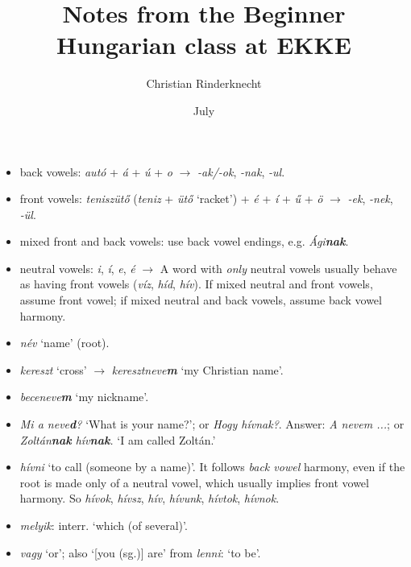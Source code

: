 \documentclass[a4paper,11pt]{article}
\title{Notes from the Beginner Hungarian class at EKKE}
\date{July \oldstylenums{2026}}
\author{Christian Rinderknecht}
\begin{document}
\maketitle

\begin{itemize}

  \item back vowels: \emph{autó} + \emph{á} + \emph{ú} + \emph{o}
    $\rightarrow$ \emph{-ak/-ok}, \emph{-nak}, \emph{-ul}.

  \item front vowels: \emph{teniszütő} (\emph{teniz} + \emph{ütő}
    `racket') + \emph{é} + \emph{í} + \emph{ű} + \emph{ö}
    $\rightarrow$ \emph{-ek}, \emph{-nek}, \emph{-ül}.

  \item mixed front and back vowels: use back vowel endings,
    e.g. \emph{Ági\textbf{nak}}.

  \item neutral vowels: \emph{i}, \emph{í}, \emph{e}, \emph{é}
    $\rightarrow$ A word with \emph{only} neutral vowels usually
    behave as having front vowels (\emph{víz}, \emph{híd},
    \emph{hív}). If mixed neutral and front vowels, assume front
    vowel; if mixed neutral and back vowels, assume back vowel
    harmony.

  \item \emph{név} `name' (root).

  \item \emph{kereszt} `cross' $\rightarrow$
    \emph{keresztneve\textbf{m}} `my Christian name'.

  \item \emph{beceneve\textbf{m}} `my nickname'.

  \item \emph{Mi a neve\textbf{d}?} `What is your name?'; or
    \emph{Hogy hívnak?}. Answer: \emph{A nevem ...}; or
    \emph{Zoltán\textbf{nak} hív\textbf{nak}.} `I am called Zoltán.'

  \item \emph{hívni} `to call (someone by a name)'. It follows
    \emph{back vowel} harmony, even if the root is made only of a
    neutral vowel, which usually implies front vowel harmony. So
    \emph{hívok}, \emph{hívsz}, \emph{hív}, \emph{hívunk},
    \emph{hívtok}, \emph{hívnok}.

  \item \emph{melyik}: interr. `which (of several)'.

  \item \emph{vagy} `or'; also `[you (sg.)] are' from \emph{lenni}:
    `to be'.


\end{itemize}
\end{document}
